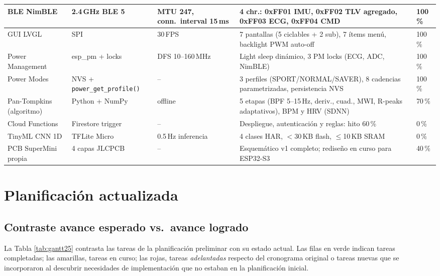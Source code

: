 \documentclass[letterpaper,11pt]{article}
\newcommand{\rtabla}[1]{Tabla \ref{#1}}
\begin{document}
\begin{table}[H]
\begin{tabular}{|L{2.6cm}|L{2.0cm}|L{2.6cm}|L{4.6cm}|L{2.0cm}|}
    BLE NimBLE           & 2.4\,GHz BLE 5    & MTU 247, conn.\ interval 15\,ms                & 4 chr.: 0xFF01 IMU, 0xFF02 TLV agregado, 0xFF03 ECG, 0xFF04 CMD    & 100\,\% \\\hline
    GUI LVGL             & SPI                & 30\,FPS                                         & 7 pantallas (5 ciclables + 2 sub), 7 ítems menú, backlight PWM auto-off & 100\,\% \\\hline
    Power Management     & esp\_pm + locks   & DFS 10--160\,MHz                                & Light sleep dinámico, 3 PM locks (ECG, ADC, NimBLE)                & 100\,\% \\\hline
    Power Modes          & NVS + \texttt{power\_get\_profile()} & --                             & 3 perfiles (SPORT/NORMAL/SAVER), 8 cadencias parametrizadas, persistencia NVS & 100\,\% \\\hline
    Pan-Tompkins (algoritmo) & Python + NumPy & offline                                       & 5 etapas (BPF 5--15\,Hz, deriv., cuad., MWI, R-peaks adaptativos), BPM y HRV (SDNN) & 70\,\% \\\hline
    Cloud Functions      & Firestore trigger & --                                              & Despliegue, autenticación y reglas: hito 60\,\%                    & 0\,\% \\\hline
    TinyML CNN 1D        & TFLite Micro      & 0.5\,Hz inferencia                              & 4 clases HAR, $<$30\,KB flash, $\leq$10\,KB SRAM                   & 0\,\% \\\hline
    PCB SuperMini propia & 4 capas JLCPCB    & --                                              & Esquemático v1 completo; rediseño en curso para ESP32-S3            & 40\,\% \\\hline
    \end{tabular}
\end{table}

\section{Planificación actualizada}

\subsection{Contraste avance esperado vs.\ avance logrado}
La \rtabla{tab:gantt25} contrasta las tareas de la planificación preliminar
con su estado actual. Las filas
en verde indican tareas completadas; las amarillas, tareas en curso; las rojas, tareas
\textit{adelantadas} respecto del cronograma original o tareas nuevas que se incorporaron al
descubrir necesidades de implementación que no estaban en la planificación inicial.
\end{document}
